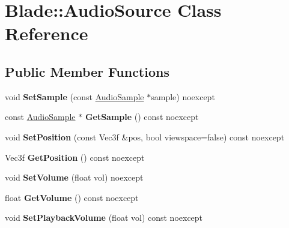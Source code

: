 \hypertarget{class_blade_1_1_audio_source}{}\section{Blade\+:\+:Audio\+Source Class Reference}
\label{class_blade_1_1_audio_source}
\subsection*{Public Member Functions}
\begin{DoxyCompactItemize}
\item 
\mbox{\label{class_blade_1_1_audio_source_a9a4faa7c65dc5559d37f805791120677}} 
void {\bfseries Set\+Sample} (const \hyperlink{class_blade_1_1_audio_sample}{Audio\+Sample} $\ast$sample) noexcept
\item 
\mbox{\label{class_blade_1_1_audio_source_acc604939d626bb629ce91868066a8873}} 
const \hyperlink{class_blade_1_1_audio_sample}{Audio\+Sample} $\ast$ {\bfseries Get\+Sample} () const noexcept
\item 
\mbox{\label{class_blade_1_1_audio_source_aac7f6a734c4b4dead31da9e91754aec3}} 
void {\bfseries Set\+Position} (const Vec3f \&pos, bool viewspace=false) const noexcept
\item 
\mbox{\label{class_blade_1_1_audio_source_a64e1100ee8e1513fe85e1df82ba3fa1f}} 
Vec3f {\bfseries Get\+Position} () const noexcept
\item 
\mbox{\label{class_blade_1_1_audio_source_acc2be0ec2cd9da234850f2a77eebdcc8}} 
void {\bfseries Set\+Volume} (float vol) noexcept
\item 
\mbox{\label{class_blade_1_1_audio_source_a82d9fc4bfdd71e6dd912118dd4193f31}} 
float {\bfseries Get\+Volume} () const noexcept
\item 
\mbox{\label{class_blade_1_1_audio_source_a6addfca8be12a2f774403f48eb47a0f3}} 
void {\bfseries Set\+Playback\+Volume} (float vol) const noexcept
\item 

\end{DoxyCompactItemize}
